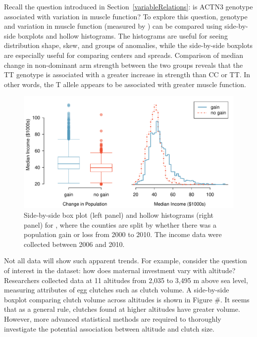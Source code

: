 \begin{doublespace}
Recall the question introduced in Section~\ref{variableRelations}: is ACTN3 genotype associated with variation in muscle function? To explore this question, genotype and variation in muscle function (measured by ) can be compared using side-by-side boxplots and hollow histograms. The histograms are useful for seeing distribution shape, skew, and groups of anomalies, while the side-by-side boxplots are especially useful for comparing centers and spreads. Comparison of median change in non-dominant arm strength between the two groups reveals that the TT genotype is associated with a greater increase in strength than CC or TT. In other words, the T allele appears to be associated with greater muscle function.

\begin{figure}
   \centering
   \includegraphics[width=\textwidth]{ch_intro_to_data_oi_biostat/figures/countyIncomeSplitByPopGain/countyIncomeSplitByPopGain}
   \caption{Side-by-side box plot (left panel) and hollow histograms (right panel) for , where the counties are split by whether there was a population gain or loss from 2000 to 2010. The income data were collected between 2006 and 2010.}
   \label{countyIncomeSplitByPopGain}
\end{figure}

Not all data will show such apparent trends. For example, consider the question of interest in the  dataset: how does maternal investment vary with altitude? Researchers collected data at 11 altitudes from 2,035 to 3,495 m above sea level, measuring attributes of egg clutches such as clutch volume. A side-by-side boxplot comparing clutch volume across altitudes is shown in Figure \#. It seems that as a general rule, clutches found at higher altitudes have greater volume. However, more advanced statistical methods are required to thoroughly investigate the potential association between altitude and clutch size.  


\end{doublespace}
